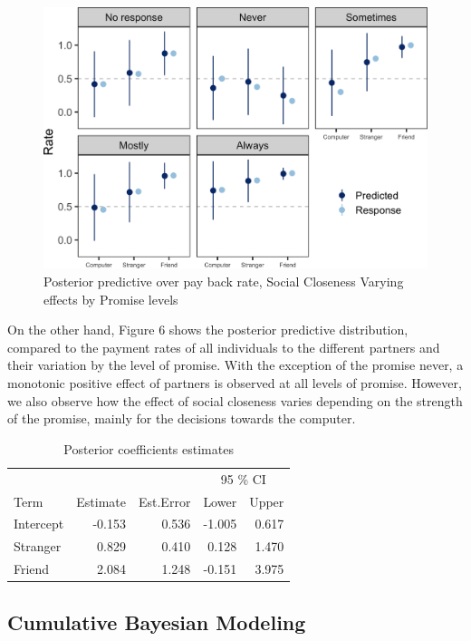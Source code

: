 \documentclass[smallextended]{svjour3}       %
\begin{document}
\begin{figure}

{\centering \includegraphics[width=0.8\linewidth]{behavioral-promises_files/figure-latex/fig6-1} 

}

\caption{Posterior predictive over pay back rate, Social Closeness Varying effects by Promise levels}\label{fig:fig6}
\end{figure}

On the other hand, Figure 6 shows the posterior predictive distribution,
compared to the payment rates of all individuals to the different
partners and their variation by the level of promise. With the exception
of the promise never, a monotonic positive effect of partners is
observed at all levels of promise. However, we also observe how the
effect of social closeness varies depending on the strength of the
promise, mainly for the decisions towards the computer.

\begin{table}[t]

\caption{\label{tab:tabla}Posterior coefficients estimates}
\begin{tabular}{lrrrr}
\toprule
\multicolumn{1}{c}{ } & \multicolumn{2}{c}{ } & \multicolumn{2}{c}{95 \% CI} \\
\cmidrule(l{3pt}r{3pt}){4-5}
Term & Estimate & Est.Error & Lower & Upper\\
\midrule
Intercept & -0.153 & 0.536 & -1.005 & 0.617\\
Stranger & 0.829 & 0.410 & 0.128 & 1.470\\
Friend & 2.084 & 1.248 & -0.151 & 3.975\\
\bottomrule
\end{tabular}
\end{table}

\hypertarget{cumulative-bayesian-modeling}{%
\subsection{Cumulative Bayesian
Modeling}\label{cumulative-bayesian-modeling}}
\end{document}
